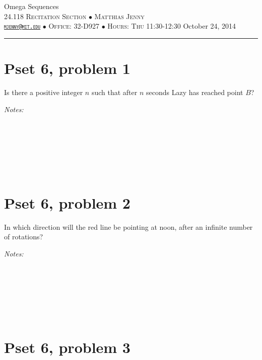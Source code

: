 \documentclass[justified]{tufte-handout}
\newcommand{\HRule}{\rule{\linewidth}{0.1mm}}
\begin{document}
\begin{fullwidth}
\noindent\LARGE Omega Sequences  \normalsize \\[.3cm]
\noindent  \textsc{24.118 Recitation Section $\bullet$ Matthias Jenny\\  {\texttt{\href{mailto:mjenny@mit.edu}{mjenny@mit.edu}}} $\bullet$ Office:  32-D927 $\bullet$ Hours: Thu 11:30-12:30} \hfill{October 24, 2014}
\noindent\HRule
\end{fullwidth}


\section{Pset 6, problem 1}

\noindent Is there a positive integer $n$ such that after $n$ seconds Lazy has reached point $B$?

\noindent \emph{Notes:}  \underline{\hspace{15.4cm}}\\\\\underline{\hspace{16.43cm}}\\\\\underline{\hspace{16.43cm}}\\\\\underline{\hspace{16.43cm}}\\

\section{Pset 6, problem 2}

\noindent In which direction will the red line be pointing at noon, after an infinite number of rotations?

\noindent \emph{Notes:}  \underline{\hspace{15.4cm}}\\\\\underline{\hspace{16.43cm}}\\\\\underline{\hspace{16.43cm}}\\\\\underline{\hspace{16.43cm}}\\

\section{Pset 6, problem 3}
\end{document}
